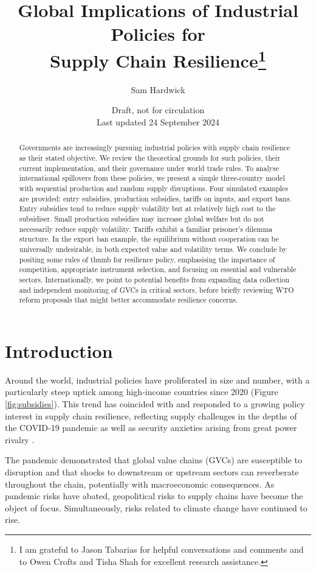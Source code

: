 \documentclass{article}
\title{Global Implications of Industrial Policies for \\ Supply Chain Resilience\thanks{I am grateful to Jason Tabarias for helpful conversations and comments and to Owen Crofts and Tisha Shah for excellent research assistance.}}
\author{Sam Hardwick}
\date{Draft, not for circulation \\ Last updated 24 September 2024}
\begin{document}
\maketitle
\begin{abstract}
    Governments are increasingly pursuing industrial policies with supply chain resilience as their stated objective. We review the theoretical grounds for such policies, their current implementation, and their governance under world trade rules. To analyse international spillovers from these policies, we present a simple three-country model with sequential production and random supply disruptions. Four simulated examples are provided: entry subsidies, production subsidies, tariffs on inputs, and export bans. Entry subsidies tend to reduce supply volatility but at relatively high cost to the subsidiser. Small production subsidies may increase global welfare but do not necessarily reduce supply volatility. Tariffs exhibit a familiar prisoner's dilemma structure. In the export ban example, the equilibrium without cooperation can be universally undesirable, in both expected value and volatility terms. We conclude by positing some rules of thumb for resilience policy, emphasising the importance of competition, appropriate instrument selection, and focusing on essential and vulnerable sectors. Internationally, we point to potential benefits from expanding data collection and independent monitoring of GVCs in critical sectors, before briefly reviewing WTO reform proposals that might better accommodate resilience concerns.
\end{abstract}

\section{Introduction}

Around the world, industrial policies have proliferated in size and number, with a particularly steep uptick among high-income countries since 2020 (Figure \ref{fig:subsidies}). This trend has coincided with and responded to a growing policy interest in supply chain resilience, reflecting supply challenges in the depths of the COVID-19 pandemic as well as security anxieties arising from great power rivalry \parencite{ilyina_industrial_2024}.

The pandemic demonstrated that global value chains (GVCs) are susceptible to disruption and that shocks to downstream or upstream sectors can reverberate throughout the chain, potentially with macroeconomic consequences. As pandemic risks have abated, geopolitical risks to supply chains have become the object of focus. Simultaneously, risks related to climate change have continued to rise.
\end{document}
